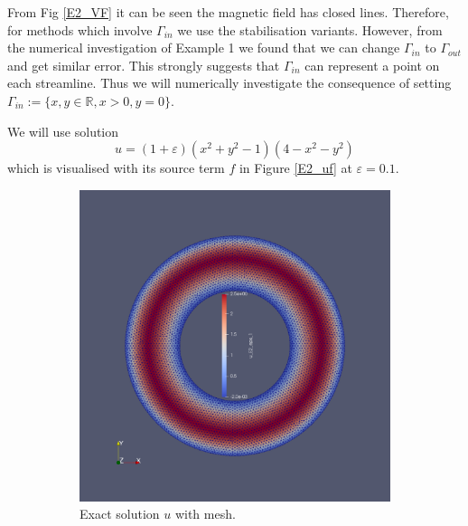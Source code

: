 \documentclass[12pt]{ociamthesis}
\begin{document}
From Fig \ref{E2_VF} it can be seen the magnetic field has closed lines. Therefore, for methods which involve $\Gamma_{in}$ we use the stabilisation variants. However, from the numerical investigation of Example 1 we found that we can change $\Gamma_{in}$ to $\Gamma_{out}$ and get similar error. This strongly suggests that $\Gamma_{in}$ can represent a point on each streamline. Thus we will numerically investigate the consequence of setting $\Gamma_{in}:=\{x,y \in \mathbb{R}, x>0, y=0\}$.

We will use solution
\begin{equation}
u = (1+\varepsilon)(x^2 + y^2 -1)(4-x^2-y^2)
\end{equation}
which is visualised with its source term $f$ in Figure \ref{E2_uf} at $\varepsilon = 0.1$.
\begin{figure}[H]
 \begin{subfigure}{0.5\textwidth}
     \includegraphics[width=\textwidth]{Pics/uf/U_E2_eps_1.png}
     \caption{Exact solution $u$ with mesh.}
 \end{subfigure}
   \begin{subfigure}{0.5\textwidth}

\end{subfigure}
\end{figure}
\end{document}
